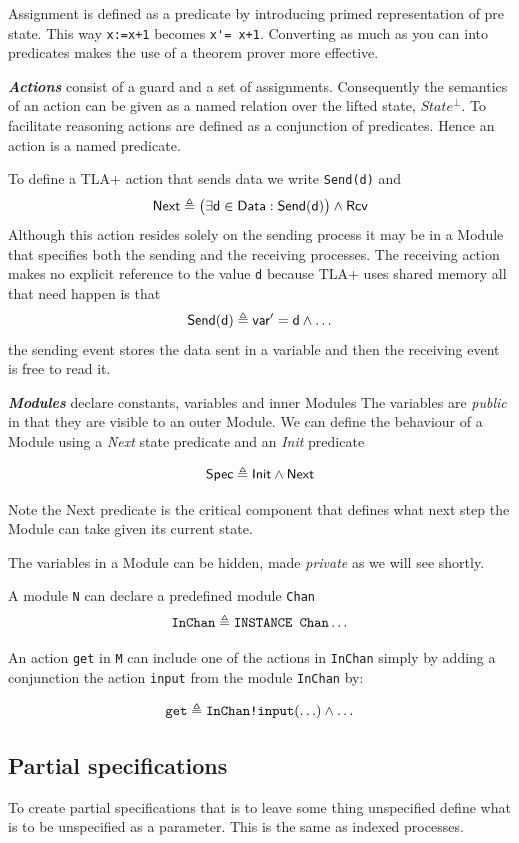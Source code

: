 \documentclass[]{article}
\begin{document}
Assignment is defined as a predicate by introducing primed representation of pre state. This way \verb$x:=x+1$ becomes \verb$x'= x+1$.  Converting as much as you can into predicates  makes  the use of a theorem prover more effective. 

\emph{\bf Actions} consist of a guard and a set of assignments. Consequently  the semantics of an action can be given as a named relation over the lifted state, $State^{\bot}$.
To facilitate reasoning actions are defined as  a conjunction of predicates. Hence an action is a named predicate.




To define a TLA+ action that sends data we write \verb|Send(d)| and  
\[{\sf Next \triangleq \big(\exists d\in Data : Send(d)\big) \land Rcv }\]
Although this action resides solely on the sending process it may be in a Module that specifies both the sending and the receiving processes. 
The receiving action makes no explicit reference to the value \verb|d| because TLA+ uses shared memory all that need happen is that 
\[ {\sf Send(d) \triangleq var' = d\land \ldots}\]
the sending event stores the data sent in a variable and then the receiving event is free to read it.


\emph{\bf Modules} declare constants, variables and inner Modules
 The variables are \emph{public} in that they are visible to an outer Module.  
 We can define the behaviour of a Module using a \emph{\sf Next} state predicate and an \emph{\sf Init} predicate
 
 \[{\sf Spec \triangleq Init \land Next}\]
 
 Note the {\sf Next} predicate is the critical component that defines what next step the Module can take given its current state.
 
 The  variables in a Module can be hidden, made \emph{private} as we will see shortly.
 

A module \verb|N| can declare a predefined module  \verb|Chan| 
\[\verb|InChan| \triangleq  \verb|INSTANCE Chan|\ldots\]




 \noindent An action \verb|get| in \verb|M| can include one of the actions in \verb|InChan| simply by adding a conjunction the action \verb|input| from the module \verb|InChan| by:

\[ \verb|get| \triangleq \verb|InChan!input|(\ldots) \land \ldots\]

\subsection{Partial specifications}
To create partial specifications that is to leave some thing unspecified define what is to be unspecified  as a parameter.  This is the same as  indexed processes.
 
\end{document}
